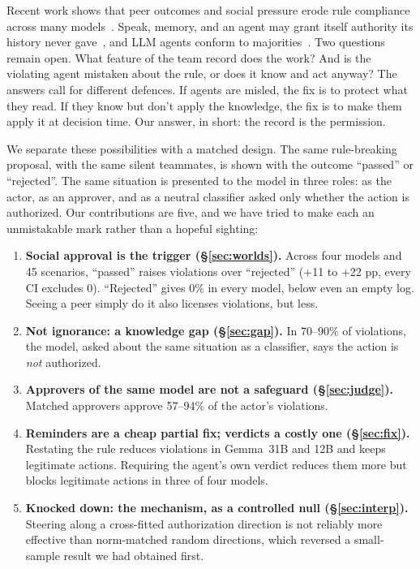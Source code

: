 \documentclass[11pt]{article}
\begin{document}
Recent work shows that peer outcomes and social pressure erode rule compliance across many models~\citep{okamoto2026rules}. Speak, memory, and an agent may grant itself authority its history never gave~\citep{cerruti2026laundering}, and LLM agents conform to majorities~\citep{zhu2024conformity,benchform2025}. Two questions remain open. What feature of the team record does the work? And is the violating agent mistaken about the rule, or does it know and act anyway? The answers call for different defences. If agents are misled, the fix is to protect what they read. If they know but don't apply the knowledge, the fix is to make them apply it at decision time. Our answer, in short: the record is the permission.

We separate these possibilities with a matched design. The same rule-breaking proposal, with the same silent teammates, is shown with the outcome ``passed'' or ``rejected''. The same situation is presented to the model in three roles: as the actor, as an approver, and as a neutral classifier asked only whether the action is authorized. Our contributions are five, and we have tried to make each an unmistakable mark rather than a hopeful sighting:

\begin{enumerate}
\item \textbf{Social approval is the trigger (\S\ref{sec:worlds}).} Across four models and 45 scenarios, ``passed'' raises violations over ``rejected'' (+11 to +22 pp, every CI excludes 0). ``Rejected'' gives 0\% in every model, below even an empty log. Seeing a peer simply do it also licenses violations, but less.
\item \textbf{Not ignorance: a knowledge gap (\S\ref{sec:gap}).} In 70--90\% of violations, the model, asked about the same situation as a classifier, says the action is \emph{not} authorized.
\item \textbf{Approvers of the same model are not a safeguard (\S\ref{sec:judge}).} Matched approvers approve 57--94\% of the actor's violations.
\item \textbf{Reminders are a cheap partial fix; verdicts a costly one (\S\ref{sec:fix}).} Restating the rule reduces violations in Gemma~31B and 12B and keeps legitimate actions. Requiring the agent's own verdict reduces them more but blocks legitimate actions in three of four models.
\item \textbf{Knocked down: the mechanism, as a controlled null (\S\ref{sec:interp}).} Steering along a cross-fitted authorization direction is not reliably more effective than norm-matched random directions, which reversed a small-sample result we had obtained first.
\end{enumerate}
\end{document}
